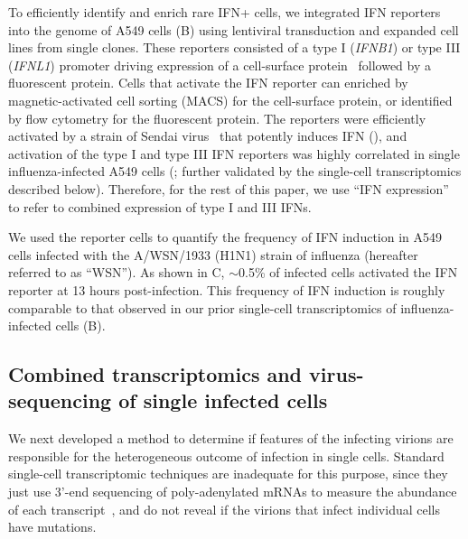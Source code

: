 \documentclass[9pt,lineno]{elife}
\begin{document}
To efficiently identify and enrich rare IFN+ cells, we integrated IFN reporters into the genome of A549 cells (B) using lentiviral transduction and expanded cell lines from single clones.
These reporters consisted of a type I (\textit{IFNB1}) or type III (\textit{IFNL1}) promoter driving expression of a cell-surface protein~\citep[LNGFR$\Delta$C;][]{bonini1997hsv,ruggieri1997cell} followed by a fluorescent protein.
Cells that activate the IFN reporter can enriched by magnetic-activated cell sorting (MACS) for the cell-surface protein, or identified by flow cytometry for the fluorescent protein.
The reporters were efficiently activated by a strain of Sendai virus~\citep{strahle2006sendai} that potently induces IFN (), and activation of the type I and type III IFN reporters was highly correlated in single influenza-infected A549 cells (; further validated by the single-cell transcriptomics described below).
Therefore, for the rest of this paper, we use ``IFN expression'' to refer to combined expression of type I and III IFNs. 

We used the reporter cells to quantify the frequency of IFN induction in A549 cells infected with the A/WSN/1933 (H1N1) strain of influenza (hereafter referred to as ``WSN'').
As shown in C, $\sim$0.5\% of infected cells activated the IFN reporter at 13 hours post-infection.
This frequency of IFN induction is roughly comparable to that observed in our prior single-cell transcriptomics of influenza-infected cells (B).

\subsection{Combined transcriptomics and virus-sequencing of single infected cells}
We next developed a method to determine if features of the infecting virions are responsible for the heterogeneous outcome of infection in single cells.
Standard single-cell transcriptomic techniques are inadequate for this purpose, since they just use 3'-end sequencing of poly-adenylated mRNAs to measure the abundance of each transcript~\citep{klein2015droplet, macosko2015highly, zheng2017massively, cao2017comprehensive, gierahn2017seq}, and do not reveal if the virions that infect individual cells have mutations. 
\end{document}
